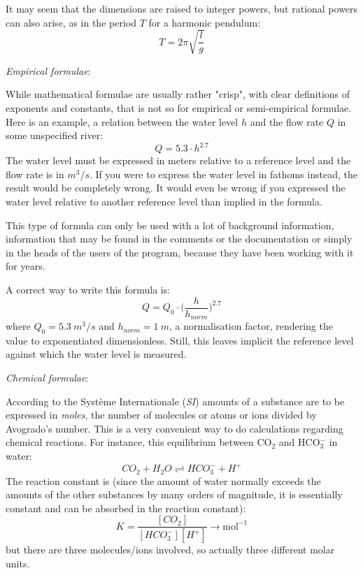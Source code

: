 \documentclass{article}
\begin{document}
It may seem that the dimensions are raised to integer powers, but rational powers can also arise, as in the period $T$ for
a harmonic pendulum:
\begin{equation}
    T = 2 \pi \sqrt{\frac{l}{g}}
\end{equation}

\vspace{\baselineskip}
\noindent \emph{Empirical formulae}:

\noindent While mathematical formulae are usually rather "crisp", with clear definitions of exponents and constants, that
is not so for empirical or semi-empirical formulae. Here is an example, a relation between the water level $h$ and the
flow rate $Q$ in some unspecified river:
%
\begin{equation}
    Q = 5.3 \cdot h^{2.7}
\end{equation}
%
The water level must be expressed in meters relative to a reference level and the flow rate is in $m^3/s$. If you were
to express the water level in fathoms instead, the result would be completely wrong. It would even be wrong if you
expressed the water level relative to another reference level than implied in the formula.

This type of formula can only be used with a lot of background information, information that may be found in the
comments or the documentation or simply in the heads of the users of the program, because they have been working with
it for years.

A correct way to write this formula is:
%
\begin{equation}
    Q = Q_0 \cdot \bigl (\frac{h}{h_{norm}} \bigr)^{2.7}
\end{equation}
%
\noindent where $Q_0 = 5.3~m^3/s$ and $h_{norm} = 1~m$, a normalisation factor, rendering the value to exponentiated
dimensionless. Still, this leaves implicit the reference level against which the water level is measured.

\vspace{\baselineskip}
\noindent \emph{Chemical formulae}:

\noindent According to the Syst\`eme Internationale (\emph{SI}) amounts of a substance are to be expressed in \emph{moles}, the number of molecules or atoms
or ions divided by Avogrado's number. This is a very convenient way to do calculations regarding chemical reactions.
For instance, this equilibrium between CO$_2$ and HCO$_3^-$ in water:
\begin{equation}
    CO_2 + H_2O \rightleftharpoons HCO_3^- + H^+
\end{equation}
%
The reaction constant is (since the amount of water normally exceeds the amounts of the other substances by many
orders of magnitude, it is essentially constant and can be absorbed in the reaction constant):
\begin{equation}
    K = \frac{[CO_2]}{[HCO_3^-][H^+]} \rightarrow \textrm{mol}^{-1}
\end{equation}
%
\noindent but there are three molecules/ions involved, so actually three different molar units.
\end{document}
